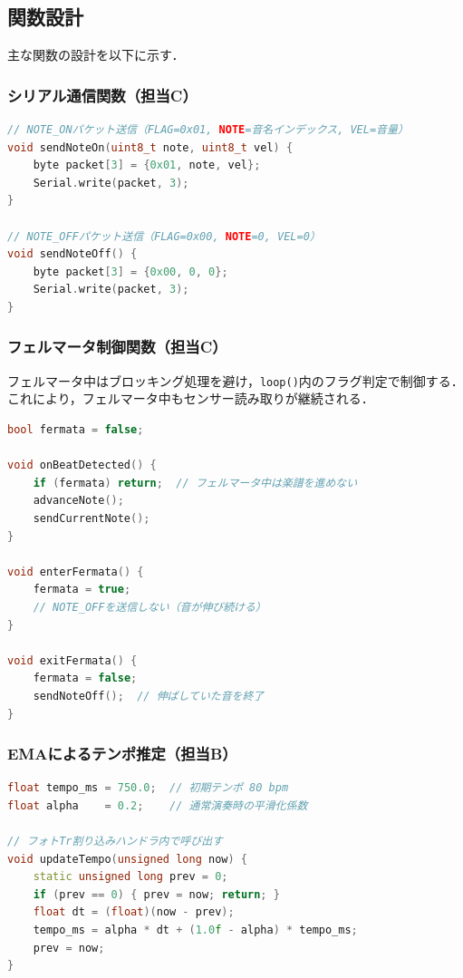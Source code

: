 \subsection{関数設計}

主な関数の設計を以下に示す．

\subsubsection*{シリアル通信関数（担当C）}

\begin{lstlisting}[language=C++, caption=NOTE\_ON/OFFパケット送信関数]
// NOTE_ONパケット送信（FLAG=0x01, NOTE=音名インデックス, VEL=音量）
void sendNoteOn(uint8_t note, uint8_t vel) {
    byte packet[3] = {0x01, note, vel};
    Serial.write(packet, 3);
}

// NOTE_OFFパケット送信（FLAG=0x00, NOTE=0, VEL=0）
void sendNoteOff() {
    byte packet[3] = {0x00, 0, 0};
    Serial.write(packet, 3);
}
\end{lstlisting}

\subsubsection*{フェルマータ制御関数（担当C）}

フェルマータ中はブロッキング処理を避け，\texttt{loop()}内のフラグ判定で制御する．
これにより，フェルマータ中もセンサー読み取りが継続される．

\begin{lstlisting}[language=C++, caption=フェルマータフラグ制御]
bool fermata = false;

void onBeatDetected() {
    if (fermata) return;  // フェルマータ中は楽譜を進めない
    advanceNote();
    sendCurrentNote();
}

void enterFermata() {
    fermata = true;
    // NOTE_OFFを送信しない（音が伸び続ける）
}

void exitFermata() {
    fermata = false;
    sendNoteOff();  // 伸ばしていた音を終了
}
\end{lstlisting}

\subsubsection*{EMAによるテンポ推定（担当B）}

\begin{lstlisting}[language=C++, caption=EMAテンポ推定関数]
float tempo_ms = 750.0;  // 初期テンポ 80 bpm
float alpha    = 0.2;    // 通常演奏時の平滑化係数

// フォトTr割り込みハンドラ内で呼び出す
void updateTempo(unsigned long now) {
    static unsigned long prev = 0;
    if (prev == 0) { prev = now; return; }
    float dt = (float)(now - prev);
    tempo_ms = alpha * dt + (1.0f - alpha) * tempo_ms;
    prev = now;
}
\end{lstlisting}

